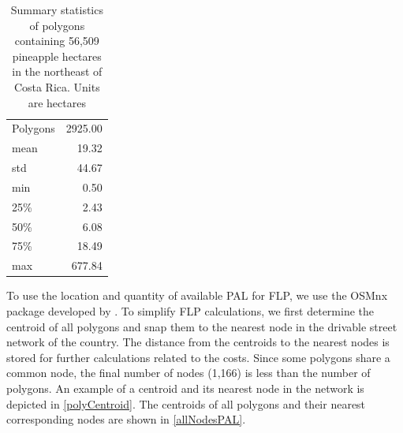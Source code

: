 \begin{table}[!ht]
\centering 
\label{summaryPolyPAL}
\caption[Summary statistics of the pineapple field polygons]{Summary statistics of polygons containing 56,509 pineapple hectares in the northeast of Costa Rica. Units are hectares}
\begin{tabular}{lr} 
\hline \hline 
Polygons & 2925.00 \\
mean     & 19.32   \\
std      & 44.67   \\
min      & 0.50    \\
25\%     & 2.43    \\
50\%     & 6.08    \\
75\%     & 18.49   \\
max      & 677.84 \\
\hline   \hline   
\end{tabular}
\label{table:1}
\end{table}

To use the location and quantity of available PAL for FLP, we use the OSMnx package developed by \cite{boeing2017osmnx}. To simplify FLP calculations, we first determine the centroid of all polygons and snap them to the nearest node in the drivable street network of the country. The distance from the centroids to the nearest nodes is stored for further calculations related to the costs. Since some polygons share a common node, the final number of nodes (1,166) is less than the number of polygons. An example of a centroid and its nearest node in the network is depicted in \cref{polyCentroid}. The centroids of all polygons and their nearest corresponding nodes are shown in \cref{allNodesPAL}. 


